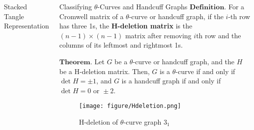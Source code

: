 \documentclass[final]{beamer}
\begin{document}
\begin{frame}[t]
\begin{columns}[t]
\begin{block}{Stacked Tangle Representation}
  \end{block}
  \begin{block}{Classifying $\theta$-Curves and Handcuff Graphs}
    $\mathbf{Definition.}$ For a Cromwell matrix of a $\theta$-curve or handcuff graph, if the $i$-th row has three 1s,
    the \textbf{H-deletion matrix} is the $(n{-}1)\times(n{-}1)$ matrix after removing $i$th row and the columns of its leftmost and rightmost 1s.

    \vspace{1em}
    $\mathbf{Theorem.}$ Let $G$ be a $\theta$-curve or handcuff graph, and the $H$ be a H-deletion matrix. Then,
    $G$ is a $\theta$-curve if and only if $\det{H} = \pm 1$, and $G$ is a handcuff graph if and only if $\det{H} = 0 \text{ or } \pm2$.
    \begin{figure}[h]
        \centering
        \texttt{[image: figure/Hdeletion.png]}
        \caption{H-deletion of $\theta$-curve graph $3_1$}
      \end{figure}
  \end{block}
\end{columns}
\end{frame}
\end{document}
